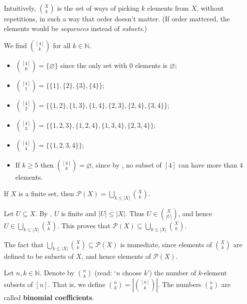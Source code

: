 Intuitively, $\binom{X}{k}$ is the set of ways of picking $k$ elements from $X$, without repetitions, in such a way that order doesn't matter. (If order mattered, the elements would be \textit{sequences} instead of \textit{subsets}.)

\begin{example} \label{exFinSubsetsOf4}
We find $\binom{[4]}{k}$ for all $k \in \mathbb{N}$.
\begin{itemize}
\item $\binom{[4]}{0} = \{\varnothing\}$ since the only set with $0$ elements is $\varnothing$;
\item $\binom{[4]}{1} = \{ \{1\}, \{2\}, \{3\}, \{4\} \}$;
\item $\binom{[4]}{2} = \{ \{1,2\}, \{1,3\}, \{1,4\}, \{2,3\}, \{2,4\}, \{3,4\} \}$;
\item $\binom{[4]}{3} = \{ \{1,2,3\}, \{1,2,4\}, \{1,3,4\}, \{2,3,4\} \}$;
\item $\binom{[4]}{4} = \{ \{ 1,2,3,4 \} \}$;
\item If $k \ge 5$ then $\binom{[4]}{k} = \varnothing$, since by , no subset of $[4]$ can have more than $4$ elements.
\end{itemize}
\end{example}

\begin{proposition}
\label{propUnionOfFinSubsetsEqPowerSet}
If $X$ is a finite set, then $\mathcal{P}(X) = \bigcup_{k \le |X|} \binom{X}{k}$.
\end{proposition}
\begin{cproof}
Let $U \subseteq X$. By , $U$ is finite and $|U| \le |X|$. Thus $U \in \binom{X}{|U|}$, and hence $U \in \bigcup_{k \le |X|} \binom{X}{k}$. This proves that $\mathcal{P}(X) \subseteq \bigcup_{k \le |X|} \binom{X}{k}$.

The fact that $\bigcup_{k \le |X|} \binom{X}{k} \subseteq \mathcal{P}(X)$ is immediate, since elements of $\binom{X}{k}$ are defined to be subsets of $X$, and hence elements of $\mathcal{P}(X)$.
\end{cproof}

\begin{definition}
\label{defBinomialCoefficient}
Let $n,k \in \mathbb{N}$. Denote by $\binom{n}{k}$ (read: `$n$ choose $k$')  the number of $k$-element subsets of $[n]$. That is, we define $\binom{n}{k} = \left|\binom{[n]}{k}\right|$. The numbers $\binom{n}{k}$ are called \textbf{binomial coefficients}.
\end{definition}

